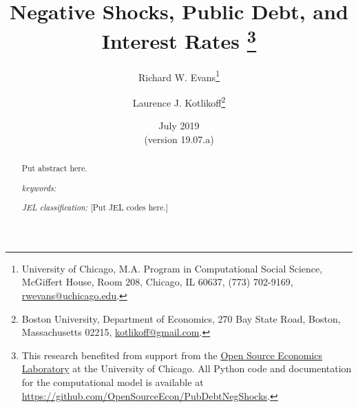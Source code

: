 \documentclass[letterpaper,12pt]{article}
\theoremstyle{definition}
\begin{document}
\begin{titlepage}
\title{Negative Shocks, Public Debt, and Interest Rates \thanks{This research benefited from support from the \href{https://www.oselab.org/}{Open Source Economics Laboratory} at the University of Chicago. All Python code and documentation for the computational model is available at \href{https://github.com/OpenSourceEcon/PubDebtNegShocks}{https://github.com/OpenSourceEcon/PubDebtNegShocks}.}
}
\author{
  Richard W. Evans\footnote{University of Chicago, M.A. Program in Computational Social Science, McGiffert House, Room 208, Chicago, IL 60637, (773) 702-9169, \href{mailto:rwevans@uchicago.edu}{rwevans@uchicago.edu}.}
  \and
  Laurence J. Kotlikoff\footnote{Boston University, Department of Economics, 270 Bay State Road, Boston, Massachusetts 02215, \href{mailto:kotlikoff@gmail.com}{kotlikoff@gmail.com}.}}
\date{July 2019 \\
  \scriptsize{(version 19.07.a)}}
\maketitle
\vspace{-9mm}
\begin{abstract}
  Put abstract here.
  \vspace{3mm}

  \noindent\textit{keywords:}

  \vspace{3mm}

  \noindent\textit{JEL classification:} [Put JEL codes here.]

\end{abstract}
\thispagestyle{empty}
\end{titlepage}
\end{document}
